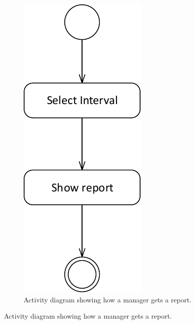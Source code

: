 \begin{figure}[H]
\begin{subfigure}[b]{0.225\textwidth}
	\includegraphics[width=\textwidth]{img/activity_diagram/show_report}
	\caption{Activity diagram showing how a manager gets a report.}
	\end{subfigure}
\end{figure}